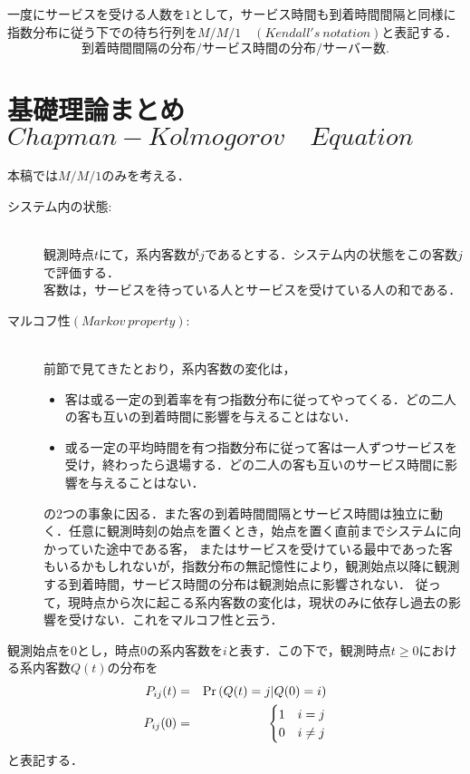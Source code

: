 \documentclass[a4j,papersize,disablejfam,slide,14pt]{jsarticle}
\def\cprob#1#2{\mbox{${\rm Pr} \left( #1 | #2 \right)$}} %
\begin{document}
    一度にサービスを受ける人数を$1$として，サービス時間も到着時間間隔と同様に指数分布に従う下での待ち行列を$M/M/1 \quad (Kendall's\ notation)$と表記する．\\
    \[
    	\mbox{到着時間間隔の分布} / \mbox{サービス時間の分布} / \mbox{サーバー数}.
    \]

\newpage
\section{基礎理論まとめ \qquad $Chapman-Kolmogorov\quad Equation$}
	本稿では$M/M/1$のみを考える．\\
    \begin{description}
		\item[システム内の状態:]\mbox{}\\
        	観測時点$t$にて，系内客数が$j$であるとする．システム内の状態をこの客数$j$で評価する．\\
            客数は，サービスを待っている人とサービスを受けている人の和である．\\
            \mbox{}
        \item[マルコフ性\　$(Markov\ property)$:]\mbox{}\\
    		前節で見てきたとおり，系内客数の変化は，
    		\begin{itemize}
    			\item 客は或る一定の到着率を有つ指数分布に従ってやってくる．どの二人の客も互いの到着時間に影響を与えることはない．
        		\item 或る一定の平均時間を有つ指数分布に従って客は一人ずつサービスを受け，終わったら退場する．どの二人の客も互いのサービス時間に影響を与えることはない．
    		\end{itemize}
    		の2つの事象に因る．また客の到着時間間隔とサービス時間は独立に動く．任意に観測時刻の始点を置くとき，始点を置く直前までシステムに向かっていた途中である客，
    		またはサービスを受けている最中であった客もいるかもしれないが，指数分布の無記憶性により，観測始点以降に観測する到着時間，サービス時間の分布は観測始点に影響されない．
    		従って，現時点から次に起こる系内客数の変化は，現状のみに依存し過去の影響を受けない．これをマルコフ性と云う．\\
            \mbox{}
    \end{description}
    観測始点を$0$とし，時点$0$の系内客数を$i$と表す．この下で，観測時点$t \geq 0$における系内客数$Q(t)$の分布を
    \begin{eqnarray}
    	P_{ij}(t) &=& \cprob{Q(t) = j}{Q(0) = i} \\
        P_{ij}(0) &=& 
        \begin{cases}
        	1 & \text{$i = j$} \\
            0 & \text{$i \neq j$}
        \end{cases}
    \end{eqnarray}
    と表記する．
\end{document}

